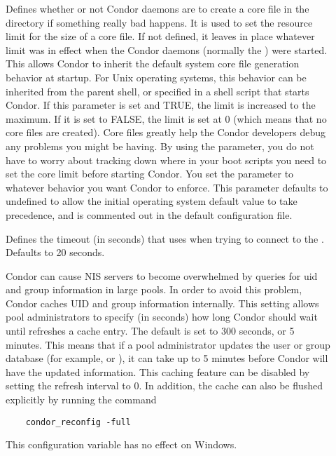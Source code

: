 \begin{description}
\item[] \label{param:CreateCoreFiles}
  Defines whether or not Condor daemons are to
  create a core file in the  directory
  if something really bad happens.  It is
  used to set
  the resource limit for the size of a core file.  If not defined,
  it leaves in place whatever limit was in effect
  when the Condor daemons (normally the ) were started.
  This allows Condor to inherit the default system core file generation
  behavior at startup.  For Unix operating systems, this behavior can
  be inherited from the parent shell, or specified in a shell script
  that starts Condor.
  If this parameter is set and TRUE, the limit is increased to
  the maximum.  If it is set to FALSE, the limit is set at 0
  (which means that no core files are created).  Core files
  greatly help the Condor developers debug any problems you might be
  having.  By using the parameter, you do not have to worry about
  tracking down where in your boot scripts you need to set the core
  limit before starting Condor. You set the parameter
  to whatever behavior you want Condor to enforce.  This parameter
  defaults to undefined to allow the initial operating system default
  value to take precedence, 
  and is commented out in the default configuration file. 

\item[] \label{param:QQueryTimeout}
  Defines the timeout (in seconds) that  uses when trying to
  connect to the .  Defaults to 20 seconds.
\item[]
  \label{param:PasswdCacheRefresh}
  Condor can cause NIS servers to become overwhelmed by queries for uid
  and group information in large pools. In order to avoid this problem,
  Condor caches UID and group information internally. This setting allows
  pool administrators to specify (in seconds) how long Condor should wait
  until refreshes a cache entry. The default is set to 300 seconds, or
  5 minutes. This means that if a pool administrator updates the user
  or group database (for example,  or ),
  it can take up
  to 5 minutes before Condor will have the updated information. This
  caching feature can be disabled by setting the refresh interval to
  0. In addition, the cache can also be flushed explicitly by running
  the command
  \begin{verbatim}
    condor_reconfig -full
  \end{verbatim}
  This configuration variable has no effect on Windows.


\end{description}
